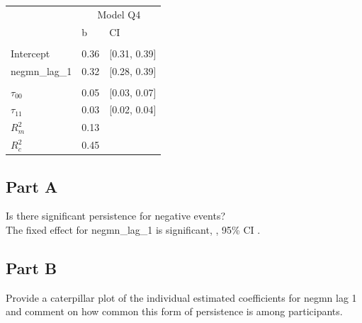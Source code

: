 \documentclass[]{article}
\begin{document}
\begin{table}[H]
\centering
\begin{tabular}{lll}
\toprule
\multicolumn{1}{c}{ } & \multicolumn{2}{c}{Model Q4} \\
\cmidrule(l{2pt}r{2pt}){2-3}
 & b & CI\\
\midrule
\addlinespace[0.3em]
\multicolumn{3}{l}{\textbf{Fixed}}\\
\hspace{1em}Intercept & 0.36 & [0.31, 0.39]\\
\hspace{1em}negmn\_lag\_1 & 0.32 & [0.28, 0.39]\\
\addlinespace[0.3em]
\multicolumn{3}{l}{\textbf{Random}}\\
\hspace{1em}$\tau_{00}$ & 0.05 & [0.03, 0.07]\\
\hspace{1em}$\tau_{11}$ & 0.03 & [0.02, 0.04]\\
$R^2_m$ & 0.13 & \\
$R^2_c$ & 0.45 & \\
\bottomrule
\end{tabular}
\end{table}

\subsection{Part A}\label{part-a-2}

Is there significant persistence for negative events?\\
The fixed effect for negmn\_lag\_1 is significant, , 95\% CI .

\subsection{Part B}\label{part-b-2}

Provide a caterpillar plot of the individual estimated coefficients for
negmn lag 1 and comment on how common this form of persistence is among
participants.
\end{document}
